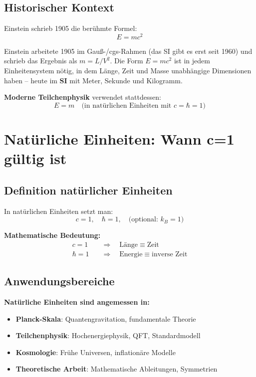 	\subsection{Historischer Kontext}
	
	Einstein schrieb 1905 die berühmte Formel:
	\begin{equation}
		E = mc^2
	\end{equation}
	
	Einstein arbeitete 1905 im Gauß-/cgs-Rahmen (das SI gibt es erst seit 1960) und schrieb das Ergebnis als $m = L/V^2$. Die Form $E = mc^2$ ist in jedem Einheitensystem nötig, in dem Länge, Zeit und Masse unabhängige Dimensionen haben -- heute im \textbf{SI} mit Meter, Sekunde und Kilogramm.
	
	\textbf{Moderne Teilchenphysik} verwendet stattdessen:
	\begin{equation}
		E = m \quad \text{(in natürlichen Einheiten mit } c=\hbar=1\text{)}
	\end{equation}
	
	\section{Natürliche Einheiten: Wann c=1 gültig ist}
	
	\subsection{Definition natürlicher Einheiten}
	
	In natürlichen Einheiten setzt man:
	\begin{equation}
		c = 1, \quad \hbar = 1, \quad \text{(optional: } k_B = 1 \text{)}
	\end{equation}
	
	\textbf{Mathematische Bedeutung:}
	\begin{align}
		c = 1 \quad &\Rightarrow \quad \text{Länge} \equiv \text{Zeit} \\
		\hbar = 1 \quad &\Rightarrow \quad \text{Energie} \equiv \text{inverse Zeit}
	\end{align}
	
	\subsection{Anwendungsbereiche}
	
	\textbf{Natürliche Einheiten sind angemessen in:}
	
	\begin{itemize}
		\item \textbf{Planck-Skala}: Quantengravitation, fundamentale Theorie
		\item \textbf{Teilchenphysik}: Hochenergiephysik, QFT, Standardmodell
		\item \textbf{Kosmologie}: Frühe Universen, inflationäre Modelle
		\item \textbf{Theoretische Arbeit}: Mathematische Ableitungen, Symmetrien
	\end{itemize}
	
